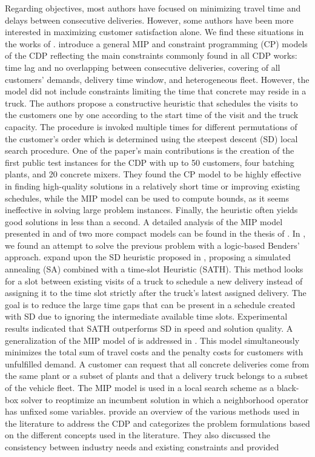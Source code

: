 \documentclass{article}
\begin{document}
Regarding objectives, most authors have focused on minimizing travel time and delays between consecutive deliveries. However, some authors have been more interested in maximizing customer satisfaction alone. We find these situations in the works of \cite{durbin2008or, kinable2014concrete, kinable2014logic, sulaman2017simulated}. \cite{kinable2014concrete} introduce a general MIP and constraint programming (CP) models of the CDP reflecting the main constraints commonly found in all CDP works: time lag and no overlapping between consecutive deliveries, covering of all customers' demands, delivery time window, and heterogeneous fleet. However, the model did not include constraints limiting the time that concrete may reside in a truck. The authors propose a constructive heuristic that schedules the visits to the customers one by one according to the start time of the visit and the truck capacity. The procedure is invoked multiple times for different permutations of the customer's order which is determined using the steepest descent (SD) local search procedure. One of the paper's main contributions is the creation of the first public test instances for the CDP with up to 50 customers, four batching plants, and 20 concrete mixers. They found the CP model to be highly effective in finding high-quality solutions in a relatively short time or improving existing schedules, while the MIP model can be used to compute bounds, as it seems ineffective in solving large problem instances. Finally, the heuristic often yields good solutions in less than a second. A detailed analysis of the MIP model presented in \cite{kinable2014concrete} and of two more compact models can be found in the thesis of \cite{hernandez_lopez_study_2020}. In \cite{kinable2014logic}, we found an attempt to solve the previous problem with a logic-based Benders' approach. \cite{sulaman2017simulated} expand upon the SD heuristic proposed in \cite{kinable2014concrete}, proposing a simulated annealing (SA) combined with a time-slot Heuristic (SATH). This method looks for a slot between existing visits of a truck to schedule a new delivery instead of assigning it to the time slot strictly after the truck's latest assigned delivery. The goal is to reduce the large time gaps that can be present in a schedule created with SD due to ignoring the intermediate available time slots. Experimental results indicated that SATH outperforms SD in speed and solution quality. A generalization of the MIP model of \cite{kinable2014concrete} is addressed in \cite{asbach2009analysis}. This model simultaneously minimizes the total sum of travel costs and the penalty costs for customers with unfulfilled demand. A customer can request that all concrete deliveries come from the same plant or a subset of plants and that a delivery truck belongs to a subset of the vehicle fleet. The MIP model is used in a local search scheme as a black-box solver to reoptimize an incumbent solution in which a neighborhood operator has unfixed some variables. \cite{tzanetos2023systematic} provide an overview of the various methods used in the literature to address the CDP and categorizes the problem formulations based on the different concepts used in the literature. They also discussed the consistency between industry needs and existing constraints and provided 
\end{document}
